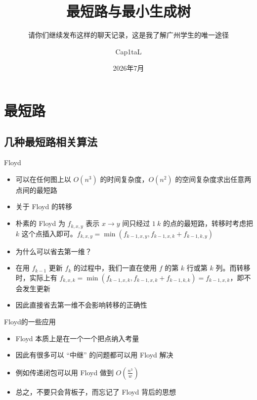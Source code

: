 ﻿\documentclass[aspectratio=169]{ctexbeamer}
\author{Cap1taL}
\title{最短路与最小生成树}
\subtitle{请你们继续发布这样的聊天记录，这是我了解广州学生的唯一途径}
\date{2026年7月}
\begin{document}
\kaishu

\begin{frame}
    \titlepage
\end{frame}


\section{最短路}

\subsection{几种最短路相关算法}

\begin{frame}{Floyd}
    \begin{itemize}
        \item 可以在任何图上以 $O(n^3)$ 的时间复杂度，$O(n^2)$ 的空间复杂度求出任意两点间的最短路

        \item 关于 Floyd 的转移

        \item 朴素的 Floyd 为 $f_{k,x,y}$ 表示 $x\to y$ 间只经过 $1~k$ 的点的最短路，转移时考虑把 $k$ 这个点插入即可。$f_{k,x,y}=\min\left(f_{k-1,x,y},f_{k-1,x,k}+f_{k-1,k,y}\right)$

        \item 为什么可以省去第一维？
        
        \item 在用 $f_{k-1}$ 更新 $f_k$ 的过程中，我们一直在使用 $f$ 的第 $k$ 行或第 $k$ 列。而转移时，实际上有 $f_{k,x,k}=\min\left(f_{k-1,x,k},f_{k-1,x,k}+f_{k-1,k,k}\right)=f_{k-1,x,k}$，即不会发生更新
        
        \item 因此直接省去第一维不会影响转移的正确性
    \end{itemize}
\end{frame}

\begin{frame}{Floyd的一些应用}
    \begin{itemize}
        \item Floyd 本质上是在一个一个把点纳入考量
        \item 因此有很多可以 “中继” 的问题都可以用 Floyd 解决
        \item 例如传递闭包可以用 Floyd 做到 $O(\frac{n^3}{w})$
        \item 总之，不要只会背板子，而忘记了 Floyd 背后的思想
    \end{itemize}
\end{frame}
\end{document}
